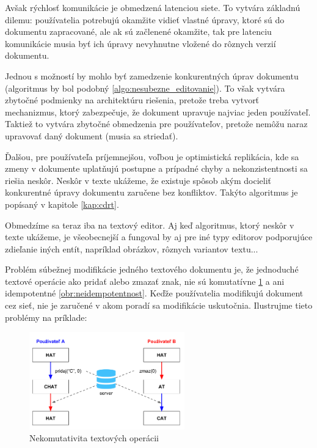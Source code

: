 Avšak rýchlosť komunikácie je obmedzená latenciou siete. To vytvára základnú dilemu: 
používatelia potrebujú okamžite vidieť vlastné úpravy, ktoré sú do dokumentu zapracované,
ale ak sú začlenené okamžite, tak pre latenciu komunikácie musia byť ich
úpravy nevyhnutne vložené do rôznych verzií dokumentu.

Jednou s možností by mohlo byť zamedzenie konkurentných úprav dokumentu (algoritmus by bol podobný
\ref{algo:nesubezne_editovanie}). To však vytvára zbytočné podmienky na architektúru riešenia,
pretože treba vytvorť mechanizmus, ktorý zabezpečuje, že dokument upravuje najviac jeden
používateľ. Taktiež to vytvára zbytočné obmedzenia pre používateľov, pretože nemôžu naraz
upravovať daný dokument (musia sa striedať).

Ďalšou, pre používateľa príjemnejšou, voľbou je optimistická
replikácia, kde sa zmeny v dokumente uplatňujú postupne a prípadné chyby a nekonzistentnosti sa
riešia neskôr. Neskôr v texte ukážeme, že existuje spôsob akým docieliť konkurentné úpravy 
dokumentu zaručene bez konfliktov. Takýto algoritmus je popísaný v kapitole \ref{kap:cdrt}.

Obmedzíme sa teraz iba na textový editor. Aj keď algoritmus, ktorý neskôr v texte ukážeme, je
všeobecnejší a fungoval by aj pre iné typy editorov podporujúce zdieľanie iných entít, napríklad
obrázkov, rôznych variantov textu... 

\medskip

Problém súbežnej modifikácie jedného textového dokumentu je, že jednoduché textové operácie ako
pridať alebo zmazať znak, nie sú komutatívne \ref{obr:nekomutativita} a ani 
idempotentné \ref{obr:neidempotentnost}. Keďže používatelia
modifikujú dokument cez sieť, nie je zaručené v akom poradí sa modifikácie uskutočnia. 
Ilustrujme tieto problémy na príklade:

\begin{figure}[H]
\centerline{\includegraphics[width=0.6\textwidth]{images/nekomutativne_operacie}}
\caption[Nekomutativita textových operácii]{Nekomutativita textových operácii}
\label{obr:nekomutativita}
\end{figure}

